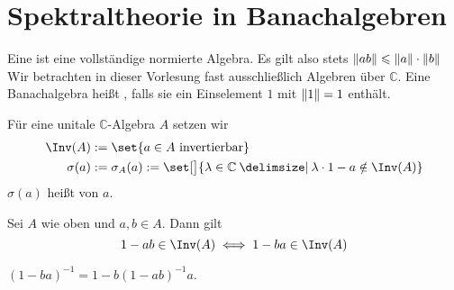 
\newcommand{\fach}{Operatoralgebren}
\newcommand{\semester}{WiSe 2015}
\newcommand{\homepage}{https://wwwmath.uni-muenster.de/u/wilhelm.winter/wwinter/operatoralgebren.html}

\newcommand{\prof}{Prof.\ Dr.\ Wilhelm Winter}



\maketitle
\begin{abstract}

\end{abstract}

\tableofcontents
\cleardoubleoddemptypage

\setcounter{page}{1}


\section{Spektraltheorie in Banachalgebren} %
\label{sec:1}

\begin{definition}[{name=[Banachalgebra]}]
	Eine  ist eine vollständige normierte Algebra. Es gilt also stets $\norm{a b} \le \norm{a} \cdot \norm{b}$
	Wir betrachten in dieser Vorlesung fast ausschließlich Algebren über $\mathds{C}$. Eine Banachalgebra heißt , falls sie ein Einselement $1$ mit $\norm{1} =1$ 
	enthält. 
\end{definition}

\begin{definition}
	Für eine unitale $\mathds{C}$-Algebra $A$ setzen wir 
	\begin{align}
		\Inv(A) &:= \set{a \in A  \text{ invertierbar} } \\
		\sigma(a) &:=\sigma_A(a) := \set[\big]{\lambda \in \mathds{C} \given \lambda \cdot 1 - a \notin \Inv(A)}
	\end{align}
	$\sigma(a)$ heißt  von $a$. 
\end{definition}

\begin{bemerkung}
	Sei $A$ wie oben und $a,b \in A$. Dann gilt
	\[
		1 -ab \in \Inv(A) \iff 1 -ba \in \Inv(A)
	\]
\end{bemerkung}
\begin{beweis}
	$(1-ba)^{-1} = 1- b(1- ab)^{-1} a$.
\end{beweis}

